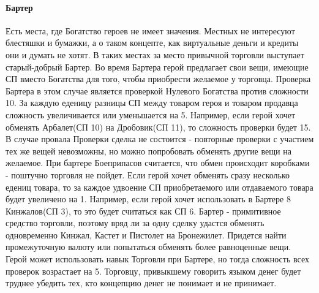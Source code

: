 \paragraph{Бартер}
Есть места, где Богатство героев не имеет значения. Местных не интересуют блестяшки и бумажки, а о таком концепте, как виртуальные деньги и кредиты они и думать не хотят. В таких местах за место привычной торговли выступает старый-добрый Бартер.
\newline Во время Бартера герой предлагает свои вещи, имеющие СП вместо Богатства для того, чтобы приобрести желаемое у торговца. Проверка Бартера в этом случае является проверкой Нулевого Богатства против сложности 10. За каждую еденицу разницы СП между товаром героя и товаром продавца сложность увеличивается или уменьшается на 5. Например, если герой хочет обменять Арбалет(СП 10) на Дробовик(СП 11), то сложность проверки будет 15.
\newline В случае провала Проверки сделка не состоится - повторные проверки с участием тех же вещей невозможны, но можно попробовать обменять другие вещи на желаемое.
\newline При бартере Боеприпасов считается, что обмен происходит коробками - поштучно торговля не пойдет.
\newline Если герой хочет обменять сразу несколько едениц товара, то за каждое удвоение СП приобретаемого или отдаваемого товара будет увеличено на 1. Например, если герой хочет использовать в Бартере 8 Кинжалов(СП 3), то это будет считаться как СП 6.
\newline Бартер - примитивное средство торговли, поэтому вряд ли за одну сделку удастся обменять одновременно Кинжал, Кастет и Пистолет на Бронежилет. Придется найти промежуточную валюту или попытаться обменять более равноценные вещи.
\newline Герой может использовать навык Торговли при Бартере, но тогда сложность всех проверок возрастает на 5. Торговцу, привыкшему говорить языком денег будет труднее убедить тех, кто концепцию денег не понимает и не принимает.
